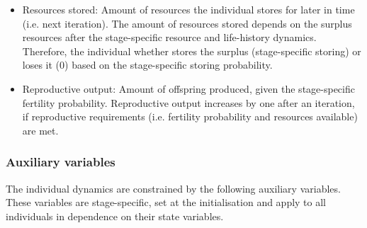 \documentclass{article}
\begin{document}
\begin{itemize}
\begin{itemize}
        \item Resources stored: Amount of resources the individual stores for later in time (i.e. next iteration). The amount of resources stored depends on the surplus resources after the stage-specific resource and life-history dynamics. Therefore, the individual whether stores the surplus (stage-specific storing) or loses it (0) based on the stage-specific storing probability.
        \item Reproductive output: Amount of offspring produced, given the stage-specific fertility probability. Reproductive output increases by one after an iteration, if reproductive requirements (i.e. fertility probability and resources available) are met.
    \end{itemize}
\end{itemize}

\subsubsection{Auxiliary variables}

The individual dynamics are constrained by the following auxiliary variables. These variables are stage-specific, set at the initialisation and apply to all individuals in dependence on their state variables.
\end{document}
